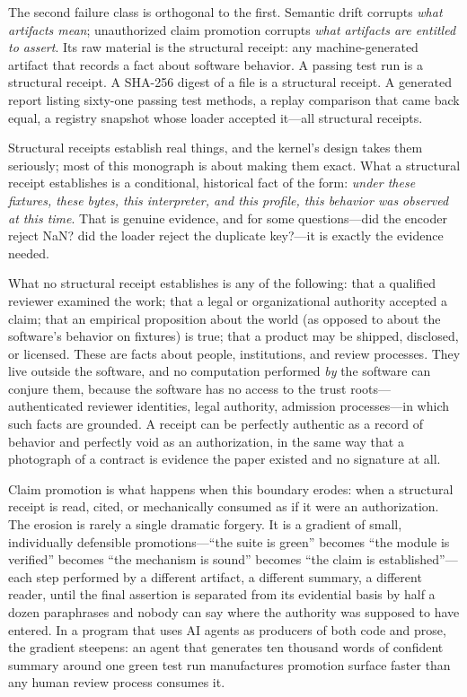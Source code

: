 The second failure class is orthogonal to the first. Semantic drift
corrupts \emph{what artifacts mean}; unauthorized claim promotion corrupts
\emph{what artifacts are entitled to assert}. Its raw material is the
structural receipt: any machine-generated artifact that records a fact
about software behavior. A passing test run is a structural receipt. A
SHA-256 digest of a file is a structural receipt. A generated report
listing sixty-one passing test methods, a replay comparison that came back
equal, a registry snapshot whose loader accepted it---all structural
receipts.

Structural receipts establish real things, and the kernel's design takes
them seriously; most of this monograph is about making them exact. What a
structural receipt establishes is a conditional, historical fact of the
form: \emph{under these fixtures, these bytes, this interpreter, and this
profile, this behavior was observed at this time}. That is genuine
evidence, and for some questions---did the encoder reject NaN? did the
loader reject the duplicate key?---it is exactly the evidence needed.

What no structural receipt establishes is any of the following: that a
qualified reviewer examined the work; that a legal or organizational
authority accepted a claim; that an empirical proposition about the world
(as opposed to about the software's behavior on fixtures) is true; that a
product may be shipped, disclosed, or licensed. These are facts about
people, institutions, and review processes. They live outside the software,
and no computation performed \emph{by} the software can conjure them,
because the software has no access to the trust roots---authenticated
reviewer identities, legal authority, admission processes---in which such
facts are grounded. A receipt can be perfectly authentic as a record of
behavior and perfectly void as an authorization, in the same way that a
photograph of a contract is evidence the paper existed and no signature at
all.

Claim promotion is what happens when this boundary erodes: when a
structural receipt is read, cited, or mechanically consumed as if it were
an authorization. The erosion is rarely a single dramatic forgery. It is a
gradient of small, individually defensible promotions---``the suite is
green'' becomes ``the module is verified'' becomes ``the mechanism is
sound'' becomes ``the claim is established''---each step performed by a
different artifact, a different summary, a different reader, until the
final assertion is separated from its evidential basis by half a dozen
paraphrases and nobody can say where the authority was supposed to have
entered. In a program that uses AI agents as producers of both code and
prose, the gradient steepens: an agent that generates ten thousand words
of confident summary around one green test run manufactures promotion
surface faster than any human review process consumes it.

